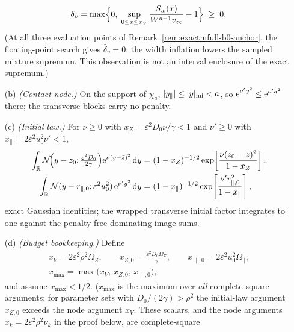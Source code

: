 \begin{lemma}
\begin{enumerate}
\begin{equation}
 \delta_v
 =\max\Bigl\{0,\;
 \sup_{0\le x\le x_V}\frac{S_w(x)}{W^{d-1}v_\infty}-1\Bigr\}
 \;\ge\;0 .
 \label{eq:exactmfull-b0-deltav}
\end{equation}
(At all three evaluation points of Remark~\ref{rem:exactmfull-b0-anchor},
the floating-point search gives \(\widehat\delta_v=0\): the width inflation
lowers the sampled mixture supremum.  This observation is not an interval
enclosure of the exact supremum.)
\item[(b)] \emph{(Contact node.)}  On the support of \(\chi_a\),
\(|y_\parallel|\le|y|_{\rm mi}<a\), so
\(\mathrm e^{\nu'y_\parallel^2}\le\mathrm e^{\nu'a^2}\) there; the transverse
blocks carry no penalty.
\item[(c)] \emph{(Initial law.)}  For \(\nu\ge0\) with
\(x_Z=\varepsilon^2D_0\nu/\gamma<1\) and \(\nu'\ge0\) with
\(x_\parallel=2\varepsilon^2u_0^2\nu'<1\),
\begin{equation}
 \begin{aligned}
 \int_{\mathbb R}
 \mathcal N\!\Bigl(y-z_0;\tfrac{\varepsilon^2D_0}{2\gamma}\Bigr)
 \mathrm e^{\nu(y-\bar z)^2}\,\mathrm d y
 &=(1-x_Z)^{-1/2}
 \exp\!\left[\frac{\nu(z_0-\bar z)^2}{1-x_Z}\right],\\
 \int_{\mathbb R}
 \mathcal N(y-r_{\parallel,0};\varepsilon^2u_0^2)\,
 \mathrm e^{\nu'y^2}\,\mathrm d y
 &=(1-x_\parallel)^{-1/2}
 \exp\!\left[\frac{\nu'r_{\parallel,0}^2}{1-x_\parallel}\right],
 \end{aligned}
 \label{eq:exactmfull-b0-initlaw}
\end{equation}
exact Gaussian identities; the wrapped transverse initial factor integrates
to one against the penalty-free dominating image sums.
\item[(d)] \emph{(Budget bookkeeping.)}  Define
\begin{equation}
 \begin{gathered}
 x_V=2\varepsilon^2\rho^2\Omega_Z,
 \qquad
 x_{Z,0}=\frac{\varepsilon^2D_0\Omega_Z}{\gamma},
 \qquad
 x_{\parallel,0}=2\varepsilon^2u_0^2\Omega_\parallel,\\
 x_{\max}=\max\bigl(x_V,\,x_{Z,0},\,x_{\parallel,0}\bigr),
 \end{gathered}
 \label{eq:exactmfull-b0-xmax}
\end{equation}
and assume \(x_{\max}<1/2\).  (\(x_{\max}\) is the maximum over \emph{all}
complete-square arguments: for parameter sets with
\(D_0/(2\gamma)>\rho^2\) the initial-law argument \(x_{Z,0}\) exceeds the
node argument \(x_V\).  These scalars, and the node arguments
\(x_k=2\varepsilon^2\rho^2\nu_k\) in the proof below, are complete-square

\end{enumerate}
\end{lemma}
